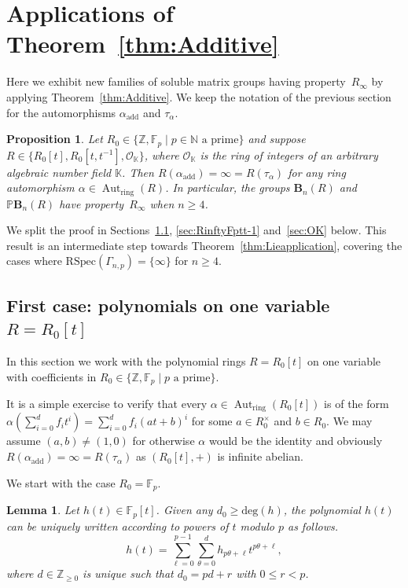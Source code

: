 \documentclass[a4paper,11pt]{amsart}
\numberwithin{equation}{section}
\theoremstyle{plain}
\newtheorem{lem}[thm]{Lemma}
\newtheorem{pps}[thm]{Proposition}
\theoremstyle{definition}
\newcommand{\N}{\mathbb{N}}
\newcommand{\Z}{\mathbb{Z}}
\newcommand{\K}{\mathbb{K}}
\newcommand{\F}{\mathbb{F}}
\newcommand{\laurent}[1]{#1[t,t^{-1}]}
\newcommand{\anel}[1]{#1_{\text{ring}}} %
\newcommand{\addi}[1]{#1_{\text{add}}} %
\newcommand{\ri}{\mathcal{O}}
\newcommand{\mbB}{\mathbf{B}} %
\newcommand{\PB}{\mathbb{P}\mathbf{B}} %
\newcommand{\set}[1]{\{ #1 \}}
\newcommand{\Ri}{R_{\infty}} %
\newcommand{\RSpec}{\mathrm{RSpec}}
\DeclareMathOperator{\Aut}{Aut}
\begin{document}
\section{Applications of Theorem~\ref{thm:Additive}}\label{applications}

Here we exhibit new families of soluble matrix groups having property~$\Ri$ by applying Theorem~\ref{thm:Additive}. We keep the notation of the previous section for the automorphisms {$\addi{\alpha}$ and $\tau_\alpha$.}

\begin{pps} \label{pps:FptFptt-1OK} 
Let $R_0 \in \set{\Z, \F_p \mid p \in \N \text{ a prime}}$ and suppose $R \in \set{R_0[t], \laurent{R_0}, \ri_\K}$, where $\ri_\K$ is the ring of integers of an \emph{arbitrary} algebraic number field $\K$. Then $R(\addi{\alpha}) = \infty = R(\tau_\alpha)$ for any ring automorphism $\alpha \in \anel{\Aut}(R)$. In particular, the groups $\mbB_n(R)$ and $\PB_n(R)$ have property~$\Ri$ when $n \geq 4$.
\end{pps}

We split the proof in Sections~\ref{sec:Fpt}, \ref{sec:RinftyFptt-1} and~\ref{sec:OK} below. 
This result is an intermediate step towards Theorem~\ref{thm:Lieapplication}, covering the cases where $\RSpec(\Gamma_{n,p}) = \{\infty\}$ for $ n \geq 4$. 

\subsection{First case: polynomials on one variable \texorpdfstring{$R = R_0[t]$}{R = R0[t]}} \label{sec:Fpt} In this section we work with the polynomial rings $R = R_0[t]$ on one variable with coefficients in $R_0 \in \set{\Z, \F_p \mid p \text{ a prime}}$. 

It is a simple exercise to verify that every $\alpha \in \anel{\Aut}(R_0[t])$ is of the form $\alpha(\sum_{i=0}^d f_i t^i) = \sum_{i=0}^d f_i (at+b)^i$ for some $a \in R_0^\times$ and $b \in R_0$. We may assume $(a,b) \neq (1,0)$ for otherwise $\alpha$ would be the identity and obviously $R(\addi{\alpha})=\infty=R(\tau_\alpha)$ as $(R_0[t],+)$ is infinite abelian.

We start with the case $R_0 = \F_p$.

\begin{lem} \label{6.1exp1}
Let $h(t) \in \F_p[t]$. Given any $d_0 \geq \mathrm{deg}(h)$, the polynomial $h(t)$ can be uniquely written according to powers of $t$ modulo $p$ as follows. 
\[ h(t) = \sum_{\ell = 0}^{p-1} \sum_{\theta=0}^{d} h_{p\theta+\ell}t^{p\theta+\ell}, \]
where $d \in \Z_{\geq 0}$ is unique such that $d_0 = pd+r$ with $0 \leq r < p$.
\end{lem}
\end{document}

